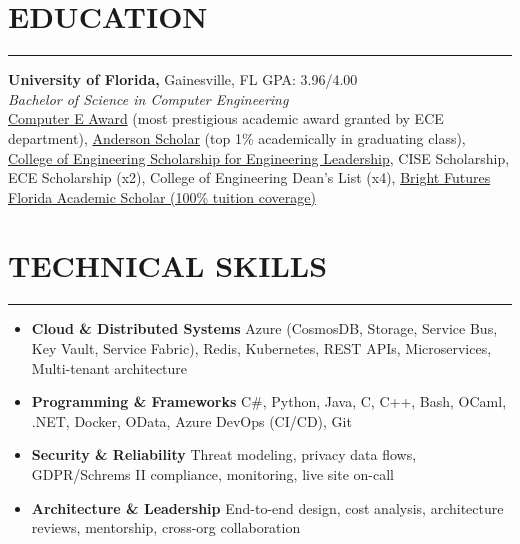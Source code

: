 \documentclass[11pt]{article}
\begin{document}
\section*{EDUCATION}
\hrule
\vspace{0.3cm}
\noindent
\textbf{University of Florida,} Gainesville, FL \hfill{GPA: 3.96/4.00}\\
\textit{Bachelor of Science in Computer Engineering}\\
    \href{https://www.ece.ufl.edu/people/student-awards/}
            {Computer E Award} (most prestigious academic award granted by ECE department),
    \href{https://clas.ufl.edu/undergraduate/anderson-scholars/}
            {Anderson Scholar} (top 1\% academically in graduating class),
    \href{https://www.eng.ufl.edu/leadership/students/scholarships/thomas-o-hunter-leadership/}
            {College of Engineering Scholarship for Engineering Leadership},
    CISE Scholarship,
    ECE Scholarship (x2),
    College of Engineering Dean\rq s List (x4),
    \href{https://en.wikipedia.org/wiki/Bright_Futures_Scholarship_Program}{Bright Futures Florida Academic Scholar (100\% tuition coverage)}

\vspace{0.6cm}
\section*{TECHNICAL SKILLS}
\hrule
\vspace{0.3cm}

\begin{itemize}[noitemsep,nolistsep,label={}]
    \item \textbf{Cloud \& Distributed Systems}
          Azure (CosmosDB, Storage, Service Bus, Key Vault, Service Fabric), 
          Redis, Kubernetes, REST APIs, Microservices, Multi-tenant architecture

    \item \textbf{Programming \& Frameworks}
          C\#, Python, Java, C, C++, Bash, OCaml, .NET, 
          Docker, OData, Azure DevOps (CI/CD), Git

    \item \textbf{Security \& Reliability}
          Threat modeling, privacy data flows, GDPR/Schrems II compliance, monitoring,
          live site on-call

    \item \textbf{Architecture \& Leadership}
          End-to-end design, cost analysis, architecture reviews,
          mentorship, cross-org collaboration

\end{itemize}
\end{document}
